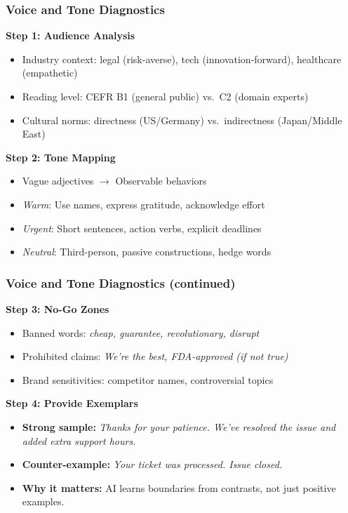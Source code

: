 \documentclass{beamer}
\begin{document}
\begin{frame}
    \frametitle{Voice and Tone Diagnostics}
    \textbf{Step 1: Audience Analysis}
    \begin{itemize}
        \item Industry context: legal (risk-averse), tech (innovation-forward), healthcare (empathetic)
        \item Reading level: CEFR B1 (general public) vs.\ C2 (domain experts)
        \item Cultural norms: directness (US/Germany) vs.\ indirectness (Japan/Middle East)
    \end{itemize}
    
    \textbf{Step 2: Tone Mapping}
    \begin{itemize}
        \item Vague adjectives $\rightarrow$ Observable behaviors
        \item \emph{Warm}: Use names, express gratitude, acknowledge effort
        \item \emph{Urgent}: Short sentences, action verbs, explicit deadlines
        \item \emph{Neutral}: Third-person, passive constructions, hedge words
    \end{itemize}
\end{frame}

\begin{frame}
    \frametitle{Voice and Tone Diagnostics (continued)}
    \textbf{Step 3: No-Go Zones}
    \begin{itemize}
        \item Banned words: \emph{cheap, guarantee, revolutionary, disrupt}
        \item Prohibited claims: \emph{We're the best, FDA-approved (if not true)}
        \item Brand sensitivities: competitor names, controversial topics
    \end{itemize}
    
    \vspace{0.3cm}
    \textbf{Step 4: Provide Exemplars}
    \begin{itemize}
        \item \textbf{Strong sample:} \emph{Thanks for your patience. We've resolved the issue and added extra support hours.}
        \item \textbf{Counter-example:} \emph{Your ticket was processed. Issue closed.}
        \item \textbf{Why it matters:} AI learns boundaries from contrasts, not just positive examples.
    \end{itemize}
\end{frame}
\end{document}
